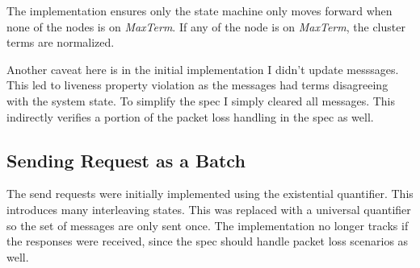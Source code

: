 The implementation ensures only the state machine only moves forward when none
of the nodes is on \textit{MaxTerm}. If any of the node is on \textit{MaxTerm},
the cluster terms are normalized.\newline

Another caveat here is in the initial implementation I didn't update messsages.
This led to liveness property violation as the messages had terms disagreeing
with the system state. To simplify the spec I simply cleared all messages. This 
indirectly verifies a portion of the packet loss handling in the spec as well.

\subsection{Sending Request as a Batch}

The send requests were initially implemented using the existential quantifier. 
This introduces many interleaving states. This was replaced with a universal
quantifier so the set of messages are only sent once. The implementation no
longer tracks if the responses were received, since the spec should handle
packet loss scenarios as well.\newline

